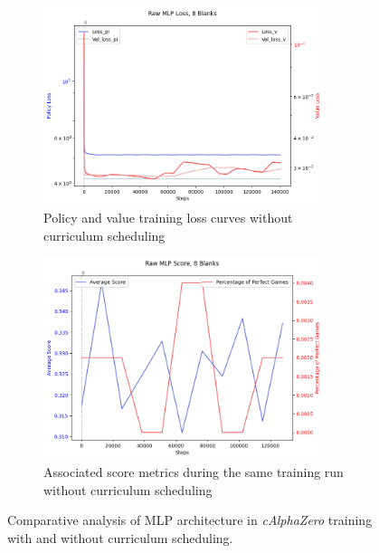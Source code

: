 \documentclass[10pt, reqno, letterpaper, twoside]{amsart}
\begin{document}
\begin{figure}[ht]
    \begin{subfigure}[b]{0.45\textwidth}
        \centering
        \includegraphics[width=0.9\textwidth]{images/Raw MLP Loss.png}
        \caption{Policy and value training loss curves without curriculum scheduling}
        \label{fig:MLP-loss-no-curriculum}
    \end{subfigure}
    \hfill
    \begin{subfigure}[b]{0.45\textwidth}
        \centering
        \includegraphics[width=0.9\textwidth]{images/Raw MLP Score.png}
        \caption{Associated score metrics during the same training run without curriculum scheduling}
        \label{fig:MLP-score-no-curriculum}
    \end{subfigure}

    \caption{Comparative analysis of MLP architecture in \textit{cAlphaZero} training with and without curriculum scheduling.}
    \label{fig:MLP-loss}
\end{figure}
\end{document}
